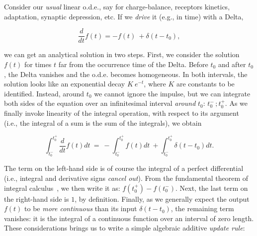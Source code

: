 \newpage
\begin{svgraybox}
	\\
		\begin{center}
		\
	\end{center}	
	Consider our \textit{usual} linear o.d.e., say for charge-balance, receptors kinetics, adaptation, synaptic depression, etc. If we \textit{drive} it (e.g., in time) with a Delta, 

	\begin{equation}
		\frac{d}{dt}f(t) = - f(t)\ + \delta(t - t_0),
	\end{equation}

	we can get an analytical solution in two steps. First, we consider the solution \(f(t)\) for times \(t\) far from the occurrence time of the Delta. Before \(t_0\) and after \(t_0\), the Delta vanishes and the o.d.e. becomes homogeneous. In both intervals, the solution looks like an exponential decay \(K\ e^ { - t}\), where \(K\) are constants to be identified. Instead, around \(t_0\) we cannot ignore the impulse, but we can integrate both sides of the equation over an infinitesimal interval \textit{around} \(t_0\):  \(t_0^ -\,  ; t_0^+ \). As we finally invoke linearity of the integral operation, with respect to its argument (i.e., the integral of a sum is the sum of the integrals), we obtain

	\begin{equation}
		\int_{t_0^-}^{t_0^ +} \frac{d}{dt}f(t) dt\ =\ - \int_{t_0^-}^{t_0^ +} f(t) dt\ + \int_{t_0^-}^{t_0^ +} \delta(t - t_0) dt.
	\end{equation}

	The term on the left-hand side is of course the integral of a perfect differential (i.e., integral and derivative signs \textit{cancel out}). From the fundamental theorem of integral calculus~\cite{ThompsonGardner:1998}, we then write it as: \(f(t_0^+) - f(t_0^-)\). Next, the last term on the right-hand side is \(1\), by definition. Finally, as we generally expect the output \(f(t)\) to be \textit{more continuous} than its input \(\delta(t - t_0)\), the remaining term vanishes: it is the integral of a continuous function over an interval of zero length. These considerations brings us to write a simple algebraic additive \textit{update rule}:
	

\end{svgraybox}
